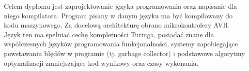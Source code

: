 \documentclass[12pt]{article}
\begin{document}
Celem dyplomu jest zaprojektowanie języka programowania oraz napisanie dla niego kompilatora. Program pisany w danym języku ma być kompilowany do kodu maszynowego. Za docelową architekturę obrano mikrokontrolery AVR. Język ten ma spełniać cechę kompletności Turinga, posiadać znane dla współczesnych języków programowania funkcjonalności, systemy zapobiegające powstawaniu błędów w programie (tj. garbage collector) i podstawowe algorytmy optymalizacji zmniejszające kod wynikowy oraz czasy wykonania.
\end{document}
